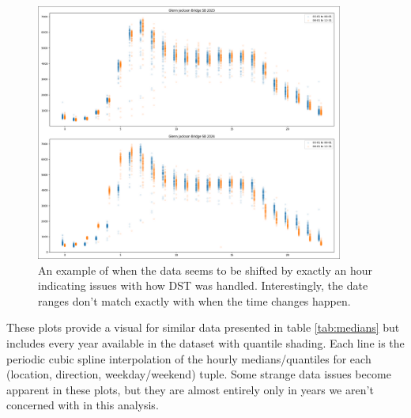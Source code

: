 \documentclass{article}
\begin{document}
\begin{figure}[H] 
    \centering
    \includegraphics[width=0.9\textwidth]{dst_issue.png}
    \caption{An example of when the data seems to be shifted by exactly an hour indicating issues with how DST was handled. Interestingly, the date ranges don't match exactly with when the time changes happen.}
    \label{fig:dst_example}
\end{figure}

These plots provide a visual for similar data presented in table \ref{tab:medians} but includes every year available in the dataset with quantile shading. Each line is the periodic cubic spline interpolation of the hourly medians/quantiles for each (location, direction, weekday/weekend) tuple. Some strange data issues become apparent in these plots, but they are almost entirely only in years we aren't concerned with in this analysis.

\end{document}
